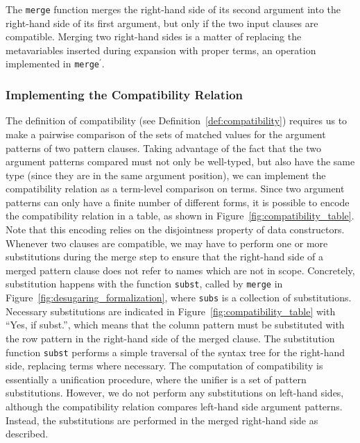 The \texttt{merge} function merges the right-hand side of its second argument
into the right-hand side of its first argument, but only if the two input
clauses are compatible. Merging two right-hand sides is a matter of replacing
the metavariables inserted during expansion with proper terms, an operation
implemented in \texttt{merge$^\prime$}.

\subsubsection{Implementing the Compatibility Relation}
The definition of compatibility (see Definition~\ref{def:compatibility})
requires us to make a pairwise comparison of the sets of matched values for the
argument patterns of two pattern clauses. Taking advantage of the fact that the
two argument patterns compared must not only be well-typed, but also have the
same type (since they are in the same argument position), we can implement the
compatibility relation as a term-level comparison on \IdrisM{} terms. Since two
argument patterns can only have a finite number of different forms, it is
possible to encode the compatibility relation in a table, as shown in
Figure~\ref{fig:compatibility_table}. Note that this encoding relies on the
disjointness property of data constructors. Whenever two clauses are compatible,
we may have to perform one or more substitutions during the merge step to ensure
that the right-hand side of a merged pattern clause does not refer to names
which are not in scope. Concretely, substitution happens with the function
\texttt{subst}, called by \texttt{merge} in
Figure~\ref{fig:desugaring_formalization}, where \texttt{subs} is a collection
of substitutions. Necessary substitutions are indicated in
Figure~\ref{fig:compatibility_table} with ``Yes, if subst.'', which means that
the column pattern must be substituted with the row pattern in the right-hand
side of the merged clause. The substitution function \texttt{subst} performs a
simple traversal of the syntax tree for the right-hand side, replacing terms
where necessary. The computation of compatibility is essentially a unification
procedure, where the unifier is a set of pattern substitutions. However, we do
not perform any substitutions on left-hand sides, although the compatibility relation
compares left-hand side argument patterns. Instead, the substitutions are
performed in the merged right-hand side as described.

